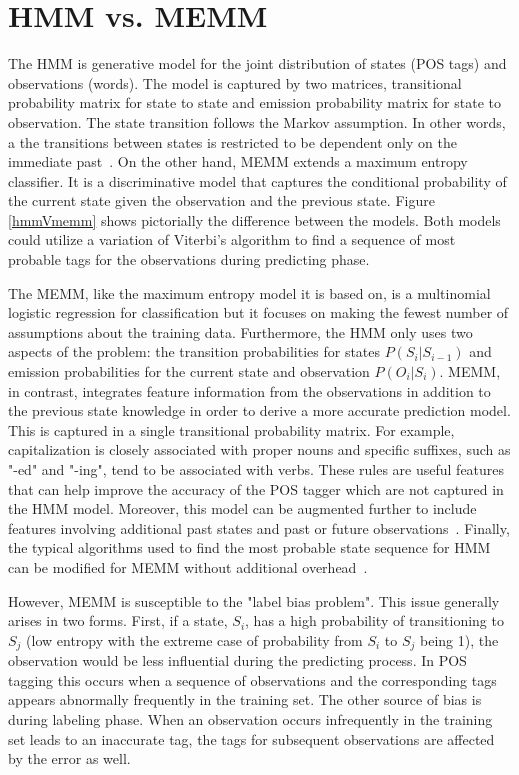 \section{HMM vs. MEMM}
\label{sec:comparison}

The HMM is generative model for the joint distribution of states (POS tags) and observations (words). The model is captured by two matrices, transitional probability matrix for state to state and emission probability matrix for state to observation. The state transition follows the Markov assumption. In other words, a the transitions between states is restricted to be dependent only on the immediate past~\cite{nlpBook}. On the other hand, MEMM extends a maximum entropy classifier. It is a discriminative model that captures the conditional probability of the current state given the observation and the previous state. Figure \ref{hmmVmemm} shows pictorially the difference between the models. Both models could utilize a variation of Viterbi's algorithm to find a sequence of most probable tags for the observations during predicting phase.

The MEMM, like the maximum entropy model it is based on, is a multinomial logistic regression for classification but it focuses on making the fewest number of assumptions about the training data. Furthermore, the HMM only uses two aspects of the problem: the transition probabilities for states $P( S_i | S_{i-1} )$ and emission probabilities for the current state and observation $P( O_i | S_i )$. MEMM, in contrast, integrates feature information from the observations in addition to the previous state knowledge in order to derive a more accurate prediction model. This is captured in a single transitional probability matrix. For example, capitalization is closely associated with proper nouns and specific suffixes, such as "-ed" and "-ing", tend to be associated with verbs. These rules are useful features that can help improve the accuracy of the POS tagger which are not captured in the HMM model. Moreover, this model can be augmented further to include features involving additional past states and past or future observations~\cite{nlpBook}. Finally, the typical algorithms used to find the most probable state sequence for HMM can be modified for MEMM without additional overhead~\cite{memmPaper}.

However, MEMM is susceptible to the "label bias problem". This issue generally arises in two forms. First, if a state, $S_i$, has a high probability of transitioning to $S_j$ (low entropy with the extreme case of probability from $S_i$ to $S_j$ being 1), the observation would be less influential during the predicting process. In POS tagging this occurs when a sequence of observations and the corresponding tags appears abnormally frequently in the training set. The other source of bias is during labeling phase. When an observation occurs infrequently in the training set leads to an inaccurate tag, the tags for subsequent observations are affected by the error as well. \cite{labelBiasProblem}

